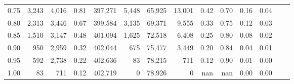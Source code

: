 \begin{tabular}{rrrrrrrrrrrrrr}
0.75 &   3,243 &  4,016 &    0.81 &  397,271 &    5,448 &  65,925 &  13,001 &  0.42 &  0.70 &  0.16 &      0.04 \\
0.80 &   2,313 &  3,446 &    0.67 &  399,584 &    3,135 &  69,371 &   9,555 &  0.33 &  0.75 &  0.12 &      0.03 \\
0.85 &   1,510 &  3,147 &    0.48 &  401,094 &    1,625 &  72,518 &   6,408 &  0.25 &  0.80 &  0.08 &      0.02 \\
0.90 &     950 &  2,959 &    0.32 &  402,044 &      675 &  75,477 &   3,449 &  0.20 &  0.84 &  0.04 &      0.01 \\
0.95 &     592 &  2,738 &    0.22 &  402,636 &       83 &  78,215 &     711 &  0.12 &  0.90 &  0.01 &      0.00 \\
1.00 &      83 &    711 &    0.12 &  402,719 &        0 &  78,926 &       0 &   nan &   nan &  0.00 &      0.00 \\
\bottomrule
\end{tabular}
